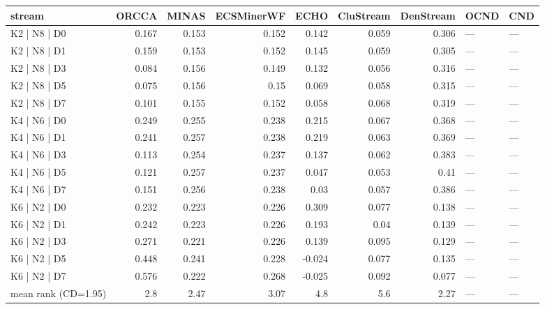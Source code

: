 \begin{tabular}{lrrrrrrll}
\hline
 stream              &   ORCCA &   MINAS &   ECSMinerWF &   ECHO &   CluStream &   DenStream & OCND   & CND   \\
\hline
 K2 | N8 | D0        &   0.167 &   0.153 &        0.152 &  0.142 &       0.059 &       0.306 & ---    & ---   \\
 K2 | N8 | D1        &   0.159 &   0.153 &        0.152 &  0.145 &       0.059 &       0.305 & ---    & ---   \\
 K2 | N8 | D3        &   0.084 &   0.156 &        0.149 &  0.132 &       0.056 &       0.316 & ---    & ---   \\
 K2 | N8 | D5        &   0.075 &   0.156 &        0.15  &  0.069 &       0.058 &       0.315 & ---    & ---   \\
 K2 | N8 | D7        &   0.101 &   0.155 &        0.152 &  0.058 &       0.068 &       0.319 & ---    & ---   \\
 K4 | N6 | D0        &   0.249 &   0.255 &        0.238 &  0.215 &       0.067 &       0.368 & ---    & ---   \\
 K4 | N6 | D1        &   0.241 &   0.257 &        0.238 &  0.219 &       0.063 &       0.369 & ---    & ---   \\
 K4 | N6 | D3        &   0.113 &   0.254 &        0.237 &  0.137 &       0.062 &       0.383 & ---    & ---   \\
 K4 | N6 | D5        &   0.121 &   0.257 &        0.237 &  0.047 &       0.053 &       0.41  & ---    & ---   \\
 K4 | N6 | D7        &   0.151 &   0.256 &        0.238 &  0.03  &       0.057 &       0.386 & ---    & ---   \\
 K6 | N2 | D0        &   0.232 &   0.223 &        0.226 &  0.309 &       0.077 &       0.138 & ---    & ---   \\
 K6 | N2 | D1        &   0.242 &   0.223 &        0.226 &  0.193 &       0.04  &       0.139 & ---    & ---   \\
 K6 | N2 | D3        &   0.271 &   0.221 &        0.226 &  0.139 &       0.095 &       0.129 & ---    & ---   \\
 K6 | N2 | D5        &   0.448 &   0.241 &        0.228 & -0.024 &       0.077 &       0.135 & ---    & ---   \\
 K6 | N2 | D7        &   0.576 &   0.222 &        0.268 & -0.025 &       0.092 &       0.077 & ---    & ---   \\
 mean rank (CD=1.95) &   2.8   &   2.47  &        3.07  &  4.8   &       5.6   &       2.27  & ---    & ---   \\
\hline
\end{tabular}